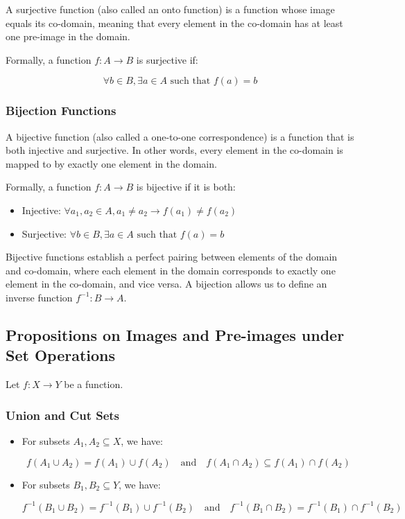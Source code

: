 A surjective function (also called an onto function) is a function whose image equals its co-domain, 
meaning that every element in the co-domain has at least one pre-image in the domain.

Formally, a function \(f: A \to B\) is surjective if:

\[
	\forall b \in B, \exists a \in A \text{ such that } f(a) = b
\]

\subsubsection{Bijection Functions}

A bijective function (also called a one-to-one correspondence) is a 
function that is both injective and surjective. In other words, every 
element in the co-domain is mapped to by exactly one element in the domain.

Formally, a function \(f: A \to B\) is bijective if it is both:

\begin{itemize}

	\item Injective: \(\forall a_1, a_2 \in A, a_1 \neq a_2 \to f(a_1) \neq f(a_2)\)

	\item Surjective: \(\forall b \in B, \exists a \in A \text{ such that } f(a) = b\)

\end{itemize}

Bijective functions establish a perfect pairing between elements of the domain and co-domain, where each 
element in the domain corresponds to exactly one element in the co-domain, and vice versa. A bijection 
allows us to define an inverse function \(f^{-1}: B \to A\).

\subsection{Propositions on Images and Pre-images under Set Operations}

Let \( f : X \to Y \) be a function.

\subsubsection{Union and Cut Sets}

\begin{itemize}

	\item For subsets \( A_1, A_2 \subseteq X \), we have:

	      \[
		      f(A_1 \cup A_2) = f(A_1) \cup f(A_2)
		      \quad \text{and} \quad
		      f(A_1 \cap A_2) \subseteq f(A_1) \cap f(A_2)
	      \]

	\item For subsets \( B_1, B_2 \subseteq Y \), we have:
	      
	      \[
		      f^{-1}(B_1 \cup B_2) = f^{-1}(B_1) \cup f^{-1}(B_2)
		      \quad \text{and} \quad
		      f^{-1}(B_1 \cap B_2) = f^{-1}(B_1) \cap f^{-1}(B_2)
	      \]
\end{itemize}

